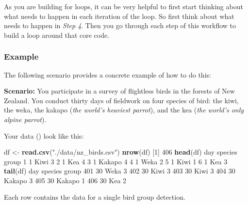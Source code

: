 \documentclass[
]{book}
\newenvironment{Shaded}{\begin{snugshade}}{\end{snugshade}}
\newcommand{\DecValTok}[1]{\textcolor[rgb]{0.00,0.00,0.81}{#1}}
\newcommand{\KeywordTok}[1]{\textcolor[rgb]{0.13,0.29,0.53}{\textbf{#1}}}
\newcommand{\NormalTok}[1]{#1}
\newcommand{\StringTok}[1]{\textcolor[rgb]{0.31,0.60,0.02}{#1}}
\begin{document}
As you are building for loops, it can be very helpful to first start thinking about what needs to happen in each iteration of the loop. So first think about what needs to happen in \emph{Step 4}. Then you go through each step of this workflow to build a loop around that core code.

\hypertarget{example}{%
\subsubsection*{Example}\label{example}}

The following scenario provides a concrete example of how to do this:

\textbf{Scenario:} You participate in a survey of flightless birds in the forests of New Zealand. You conduct thirty days of fieldwork on four species of bird: the kiwi, the weka, the kakapo (\emph{the world's heaviest parrot}), and the kea (\emph{the world's only alpine parrot}).

Your data () look like this:

\begin{Shaded}
\begin{Highlighting}[]
\NormalTok{df <-}\StringTok{ }\KeywordTok{read.csv}\NormalTok{(}\StringTok{"./data/nz_birds.csv"}\NormalTok{)}
\KeywordTok{nrow}\NormalTok{(df)}
\NormalTok{[}\DecValTok{1}\NormalTok{] }\DecValTok{406}
\KeywordTok{head}\NormalTok{(df)}
\NormalTok{  day species group}
\DecValTok{1}   \DecValTok{1}\NormalTok{    Kiwi     }\DecValTok{3}
\DecValTok{2}   \DecValTok{1}\NormalTok{     Kea     }\DecValTok{4}
\DecValTok{3}   \DecValTok{1}\NormalTok{  Kakapo     }\DecValTok{4}
\DecValTok{4}   \DecValTok{1}\NormalTok{    Weka     }\DecValTok{2}
\DecValTok{5}   \DecValTok{1}\NormalTok{    Kiwi     }\DecValTok{1}
\DecValTok{6}   \DecValTok{1}\NormalTok{     Kea     }\DecValTok{3}
\KeywordTok{tail}\NormalTok{(df)}
\NormalTok{    day species group}
\DecValTok{401}  \DecValTok{30}\NormalTok{    Weka     }\DecValTok{3}
\DecValTok{402}  \DecValTok{30}\NormalTok{    Kiwi     }\DecValTok{3}
\DecValTok{403}  \DecValTok{30}\NormalTok{    Kiwi     }\DecValTok{3}
\DecValTok{404}  \DecValTok{30}\NormalTok{  Kakapo     }\DecValTok{3}
\DecValTok{405}  \DecValTok{30}\NormalTok{  Kakapo     }\DecValTok{1}
\DecValTok{406}  \DecValTok{30}\NormalTok{     Kea     }\DecValTok{2}
\end{Highlighting}
\end{Shaded}

Each row contains the data for a single bird group detection.
\end{document}
